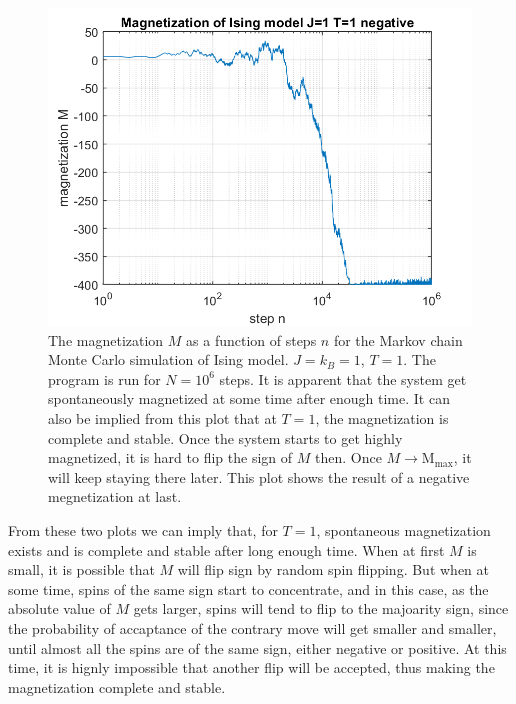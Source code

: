 \documentclass[12pt, graphicx]{article}
\begin{document}
\begin{figure}[ht]
\centering
\includegraphics[width = 120mm]{mt1n.png}
\caption{The magnetization $M$ as a function of steps $n$ for the Markov chain Monte Carlo simulation of Ising model. $J=k_B=1$, $T=1$. The program is run for $N=10^6$ steps. It is apparent that the system get spontaneously magnetized at some time after enough time. It can also be implied from this plot that at $T=1$, the magnetization is complete and stable. Once the system starts to get highly magnetized, it is hard to flip the sign of $M$ then. Once $M\to\mathrm{M_{max}}$, it will keep staying there later. This plot shows the result of a negative megnetization at last.}
\label{fig:mt1n}
\end{figure}

From these two plots we can imply that, for $T=1$, spontaneous magnetization exists and is complete and stable after long enough time. When at first $M$ is small, it is possible that $M$ will flip sign by random spin flipping. But when at some time, spins of the same sign start to concentrate, and in this case, as the absolute value of $M$ gets larger, spins will tend to flip to the majoarity sign, since the probability of accaptance of the contrary move will get smaller and smaller, until almost all the spins are of the same sign, either negative or positive. At this time, it is hignly impossible that another flip will be accepted, thus making the magnetization complete and stable.\par
\end{document}
